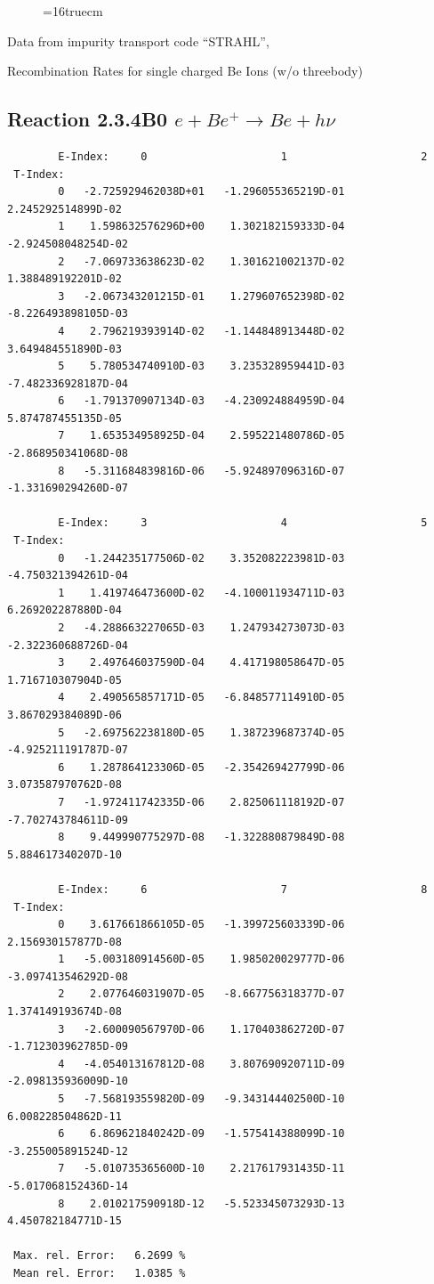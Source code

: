 \documentclass[12pt,dvips]{article}
\begin{document}
\begin{figure} \label{2.3.2C}
\epsfxsize=16truecm
\end{figure}
\newpage
Data from impurity transport code ``STRAHL'', \cite{kn:Behringer}

  Recombination Rates for single charged Be Ions (w/o threebody)

\subsection{
Reaction 2.3.4B0  $e + Be^+ \rightarrow Be + h\nu$
}


\begin{small}\begin{verbatim}
        E-Index:     0                     1                     2
 T-Index:
        0   -2.725929462038D+01   -1.296055365219D-01    2.245292514899D-02
        1    1.598632576296D+00    1.302182159333D-04   -2.924508048254D-02
        2   -7.069733638623D-02    1.301621002137D-02    1.388489192201D-02
        3   -2.067343201215D-01    1.279607652398D-02   -8.226493898105D-03
        4    2.796219393914D-02   -1.144848913448D-02    3.649484551890D-03
        5    5.780534740910D-03    3.235328959441D-03   -7.482336928187D-04
        6   -1.791370907134D-03   -4.230924884959D-04    5.874787455135D-05
        7    1.653534958925D-04    2.595221480786D-05   -2.868950341068D-08
        8   -5.311684839816D-06   -5.924897096316D-07   -1.331690294260D-07

        E-Index:     3                     4                     5
 T-Index:
        0   -1.244235177506D-02    3.352082223981D-03   -4.750321394261D-04
        1    1.419746473600D-02   -4.100011934711D-03    6.269202287880D-04
        2   -4.288663227065D-03    1.247934273073D-03   -2.322360688726D-04
        3    2.497646037590D-04    4.417198058647D-05    1.716710307904D-05
        4    2.490565857171D-05   -6.848577114910D-05    3.867029384089D-06
        5   -2.697562238180D-05    1.387239687374D-05   -4.925211191787D-07
        6    1.287864123306D-05   -2.354269427799D-06    3.073587970762D-08
        7   -1.972411742335D-06    2.825061118192D-07   -7.702743784611D-09
        8    9.449990775297D-08   -1.322880879849D-08    5.884617340207D-10

        E-Index:     6                     7                     8
 T-Index:
        0    3.617661866105D-05   -1.399725603339D-06    2.156930157877D-08
        1   -5.003180914560D-05    1.985020029777D-06   -3.097413546292D-08
        2    2.077646031907D-05   -8.667756318377D-07    1.374149193674D-08
        3   -2.600090567970D-06    1.170403862720D-07   -1.712303962785D-09
        4   -4.054013167812D-08    3.807690920711D-09   -2.098135936009D-10
        5   -7.568193559820D-09   -9.343144402500D-10    6.008228504862D-11
        6    6.869621840242D-09   -1.575414388099D-10   -3.255005891524D-12
        7   -5.010735365600D-10    2.217617931435D-11   -5.017068152436D-14
        8    2.010217590918D-12   -5.523345073293D-13    4.450782184771D-15

 Max. rel. Error:   6.2699 %
 Mean rel. Error:   1.0385 %

\end{verbatim}\end{small}
\end{document}
